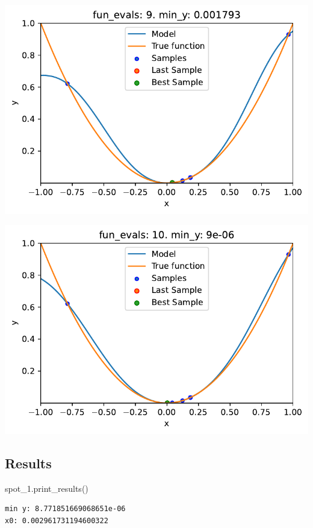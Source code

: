 \documentclass[
  letterpaper,
  DIV=11,
  numbers=noendperiod]{scrreprt}
\newenvironment{Shaded}{\begin{snugshade}}{\end{snugshade}}
\newcommand{\NormalTok}[1]{\textcolor[rgb]{0.00,0.23,0.31}{#1}}
\begin{document}
\includegraphics{010_num_spot_sklearn_surrogate_files/figure-pdf/cell-20-output-8.pdf}

\includegraphics{010_num_spot_sklearn_surrogate_files/figure-pdf/cell-20-output-9.pdf}

\subsection{Results}\label{results-2}

\begin{Shaded}
\begin{Highlighting}[]
\NormalTok{spot\_1.print\_results()}
\end{Highlighting}
\end{Shaded}

\begin{verbatim}
min y: 8.771851669068651e-06
x0: 0.002961731194600322
\end{verbatim}
\end{document}
